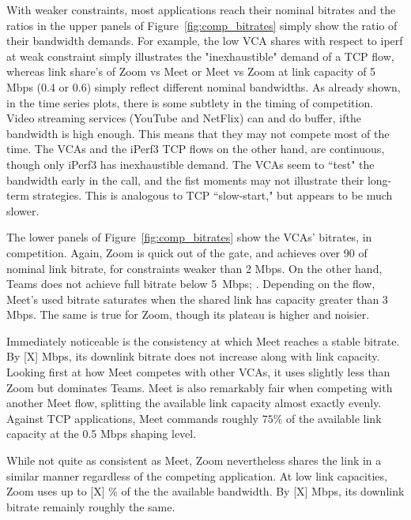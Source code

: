 With weaker constraints, most applications reach their nominal bitrates
  and the ratios in the upper panels of Figure~\ref{fig:comp_bitrates}
  simply show the ratio of their bandwidth demands.
For example, 
  the low VCA shares with respect to iperf at weak constraint
  simply illustrates the "inexhaustible" demand of a TCP flow,
  whereas link share's of Zoom vs Meet or Meet vs Zoom 
  at link capacity of 5 Mbps (0.4 or 0.6) simply 
  reflect different nominal bandwidths.
As already shown, in the time series plots, there is some subtlety in the timing of competition.
Video streaming services (YouTube and NetFlix)
  can and do buffer, ifthe bandwidth is high enough.
This means that they may not compete most of the time.
The VCAs and the iPerf3 TCP flows on the other hand, 
  are continuous, though only iPerf3 has inexhaustible demand.
The VCAs seem to ``test" the bandwidth early in the call, 
  and the fist moments may not illustrate their long-term strategies.
This is analogous to TCP ``slow-start,"
  but appears to be much slower.

The lower panels of Figure~\ref{fig:comp_bitrates} show
  the VCAs' bitrates, in competition.
Again, Zoom is quick out of the gate, and 
  achieves over 90 of nominal link bitrate,
  for constraints weaker than 2 Mbps.
On the other hand, Teams does not achieve full bitrate
  below 5~Mbps;
  .
Depending on the flow, Meet's used bitrate saturates
  when the shared link has capacity greater than 3 Mbps.
The same is true for Zoom, though its plateau is higher and noisier.
  
Immediately noticeable is the consistency at which Meet reaches a stable bitrate. By [X] Mbps, its downlink bitrate does not increase along with link capacity. Looking first at how Meet competes with other VCAs, it uses slightly less than Zoom but dominates Teams. Meet is also remarkably fair when competing with another Meet flow, splitting the available link capacity almost exactly evenly. Against TCP applications, Meet commands roughly $75\%$ of the available link capacity at the 0.5 Mbps shaping level. 

While not quite as consistent as Meet, Zoom nevertheless shares the link in a similar manner regardless of the competing application. At low link capacities, Zoom uses up to [X] \% of the the available bandwidth. By [X] Mbps, its downlink bitrate remainly roughly the same. 


